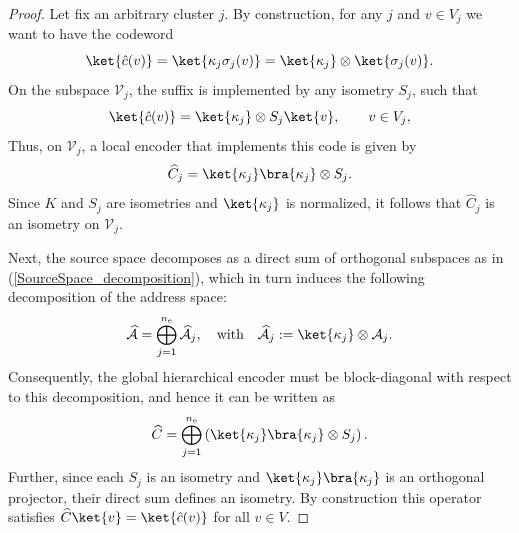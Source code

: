 \documentclass[conference]{IEEEtran}
\begin{document}
\begin{proof}
Let fix an arbitrary cluster $j$. By construction, for any $j$ and $v \in V_j$ we want to have the codeword 
\[
    \ket{\hat{c}(v)}  = \ket{\kappa_j \sigma_j(v)}
                =\ket{\kappa_j} \otimes \ket{\sigma_j(v)}.
\]
On the subspace $\mathcal{V}_j$, the suffix is implemented by any isometry ${S}_j$, such that
\[
   \ket{\hat{c}(v)} =   \ket{\kappa_j} \otimes {S}_j \ket{v},
    \qquad v \in V_j,
\]
Thus, on $\mathcal{V}_j$, a local encoder that implements this code is given by
\[\widehat{C}_{j}=\ket{\kappa_j}\bra{\kappa_j} \otimes S_j.\]
Since $K$ and $S_j$ are isometries and $\ket{\kappa_j}$ is normalized, it follows that $\widehat C_j$ is an isometry on $\mathcal{V}_j$.

Next, the source space decomposes as a direct sum of orthogonal subspaces as in (\ref{SourceSpace_decomposition}),
which in turn induces the following decomposition of the address space:
\[
\widehat{\mathcal{A}} 
= \bigoplus_{j=1}^{n_\mathrm{e}} \widehat{\mathcal{A}}_j, 
\quad \text{with} \quad
\widehat{\mathcal{A}}_j := \ket{\kappa_j} \otimes \mathcal{A}_j.
\]
Consequently, the global hierarchical encoder must be block-diagonal with respect to this decomposition, and hence it can be written as
\[
    \widehat{C}
    =
    \bigoplus_{j=1}^{n_\mathrm{e}}
    \left(
        \ket{\kappa_j}\bra{\kappa_j}
        \otimes
        S_j
    \right).
\]
Further, since each ${S}_j$ is an isometry and $\ket{\kappa_j}\bra{\kappa_j}$ is an orthogonal projector, their direct sum defines an isometry. By construction this operator satisfies $\widehat{C}\ket{v} = \ket{\hat{c}(v)}$ for all $v \in V$.
\end{proof}

\end{document}
